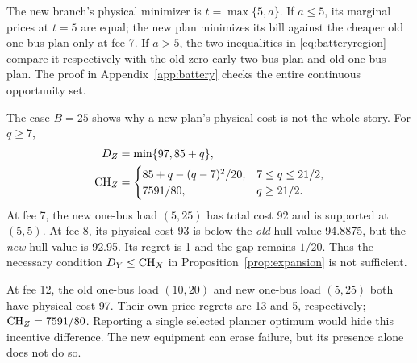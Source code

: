 The new branch's physical minimizer is $t=\max\{5,a\}$. If $a\le5$,
its marginal prices at $t=5$ are equal; the new plan minimizes its bill
against the cheaper old one-bus plan only at fee 7. If $a>5$, the two
inequalities in \eqref{eq:batteryregion} compare it respectively with
the old zero-early two-bus plan and old one-bus plan. The proof in
Appendix~\ref{app:battery} checks the entire continuous opportunity set.

The case $B=25$ shows why a new plan's physical cost is not the whole
story. For $q\ge7$,
\begin{align}
 D_Z&=\min\{97,85+q\},\label{eq:B25D}\\
 \mathrm{CH}_Z&=
 \begin{cases}
 85+q-(q-7)^2/20,&7\le q\le21/2,\\
 7591/80,&q\ge21/2.
 \end{cases}\label{eq:B25CH}
\end{align}
At fee 7, the new one-bus load $(5,25)$ has total cost 92 and is supported
at $(5,5)$. At fee 8, its physical cost 93 is below the \emph{old} hull
value 94.8875, but the \emph{new} hull value is 92.95. Its regret is 1 and
the gap remains $1/20$. Thus the necessary condition $D_Y\le\mathrm{CH}_X$
in Proposition~\ref{prop:expansion} is not sufficient.

At fee 12, the old one-bus load $(10,20)$ and new one-bus load $(5,25)$
both have physical cost 97. Their own-price regrets are 13 and 5,
respectively; $\mathrm{CH}_Z=7591/80$. Reporting a single selected planner
optimum would hide this incentive difference. The new equipment can erase
failure, but its presence alone does not do so.
